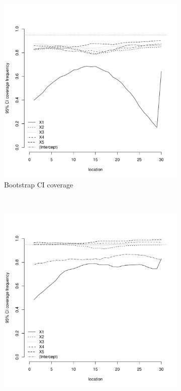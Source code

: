 \documentclass[authoryear, review, 11pt]{elsarticle}
\begin{document}
\begin{figure}
	\vspace{-30mm}
	\centering
	\begin{subfigure}[b]{0.45\textwidth}
	\centering
		\includegraphics[width=\textwidth]{../../figures/simulation/15.32.profile_bootstrap_coverage.pdf}
		\caption{Bootstrap CI coverage}
	\end{subfigure}%
	~ %
	\begin{subfigure}[b]{0.45\textwidth}
	\centering
		\includegraphics[width=\textwidth]{../../figures/simulation/15.32.profile_se_coverage.pdf}

\end{subfigure}
\end{figure}
\end{document}

